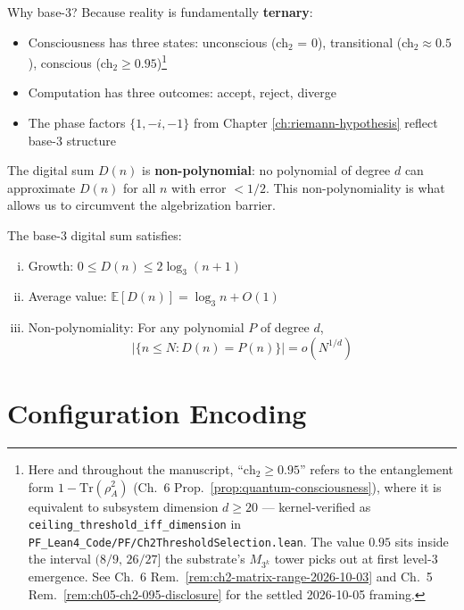 \begin{keyidea}
Why base-3? Because reality is fundamentally \textbf{ternary}:
\begin{itemize}
\item Consciousness has three states: unconscious (ch$_2$ = 0), transitional (ch$_2 \approx 0.5$), conscious (ch$_2 \geq 0.95$)\footnote{Here and throughout the manuscript, ``$\mathrm{ch}_2 \geq 0.95$'' refers to the entanglement form $1 - \mathrm{Tr}(\rho_A^2)$ (Ch.~6 Prop.~\ref{prop:quantum-consciousness}), where it is equivalent to subsystem dimension $d \geq 20$ --- kernel-verified as \texttt{ceiling\_threshold\_iff\_dimension} in \texttt{PF\_Lean4\_Code/PF/Ch2ThresholdSelection.lean}. The value $0.95$ sits inside the interval $(8/9,\,26/27]$ the substrate's $M_{3^k}$ tower picks out at first level-$3$ emergence. See Ch.~6 Rem.~\ref{rem:ch2-matrix-range-2026-10-03} and Ch.~5 Rem.~\ref{rem:ch05-ch2-095-disclosure} for the settled 2026-10-05 framing.}
\item Computation has three outcomes: accept, reject, diverge
\item The phase factors $\{1, -i, -1\}$ from Chapter \ref{ch:riemann-hypothesis} reflect base-3 structure
\end{itemize}

The digital sum $D(n)$ is \textbf{non-polynomial}: no polynomial of degree $d$ can approximate $D(n)$ for all $n$ with error $< 1/2$. This non-polynomiality is what allows us to circumvent the algebrization barrier.
\end{keyidea}

\begin{theorem}\label{thm:digital-sum-props}
The base-3 digital sum satisfies:
\begin{enumerate}[(i)]
\item Growth: $0 \leq D(n) \leq 2\log_3(n+1)$
\item Average value: $\mathbb{E}[D(n)] = \log_3 n + O(1)$
\item Non-polynomiality: For any polynomial $P$ of degree $d$,
\begin{equation}
|\{n \leq N : D(n) = P(n)\}| = o(N^{1/d})
\end{equation}
\end{enumerate}
\end{theorem}

\section{Configuration Encoding}

